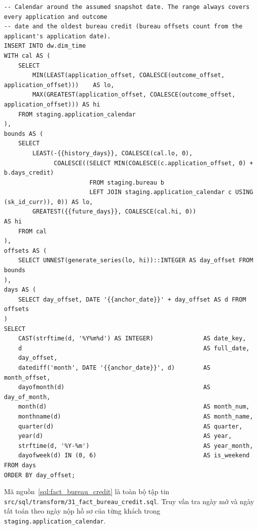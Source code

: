 \begin{listing}[H]
	\footnotesize
	\begin{verbatim}
-- Calendar around the assumed snapshot date. The range always covers every application and outcome
-- date and the oldest bureau credit (bureau offsets count from the applicant's application date).
INSERT INTO dw.dim_time
WITH cal AS (
    SELECT
        MIN(LEAST(application_offset, COALESCE(outcome_offset, application_offset)))    AS lo,
        MAX(GREATEST(application_offset, COALESCE(outcome_offset, application_offset))) AS hi
    FROM staging.application_calendar
),
bounds AS (
    SELECT
        LEAST(-{{history_days}}, COALESCE(cal.lo, 0),
              COALESCE((SELECT MIN(COALESCE(c.application_offset, 0) + b.days_credit)
                        FROM staging.bureau b
                        LEFT JOIN staging.application_calendar c USING (sk_id_curr)), 0)) AS lo,
        GREATEST({{future_days}}, COALESCE(cal.hi, 0))                                   AS hi
    FROM cal
),
offsets AS (
    SELECT UNNEST(generate_series(lo, hi))::INTEGER AS day_offset FROM bounds
),
days AS (
    SELECT day_offset, DATE '{{anchor_date}}' + day_offset AS d FROM offsets
)
SELECT
    CAST(strftime(d, '%Y%m%d') AS INTEGER)              AS date_key,
    d                                                   AS full_date,
    day_offset,
    datediff('month', DATE '{{anchor_date}}', d)        AS month_offset,
    dayofmonth(d)                                       AS day_of_month,
    month(d)                                            AS month_num,
    monthname(d)                                        AS month_name,
    quarter(d)                                          AS quarter,
    year(d)                                             AS year,
    strftime(d, '%Y-%m')                                AS year_month,
    dayofweek(d) IN (0, 6)                              AS is_weekend
FROM days
ORDER BY day_offset;
\end{verbatim}
	\caption{Truy vấn sinh bảng \texttt{dim\_time}}
	\label{sql:dim_time}
\end{listing}

Mã nguồn~\ref{sql:fact_bureau_credit} là toàn bộ tập tin \texttt{src/sql/transform/31\_fact\_bureau\_credit.sql}. Truy vấn tra ngày mở và ngày tất toán theo ngày nộp hồ sơ của từng khách trong \texttt{staging.application\_calendar}.

